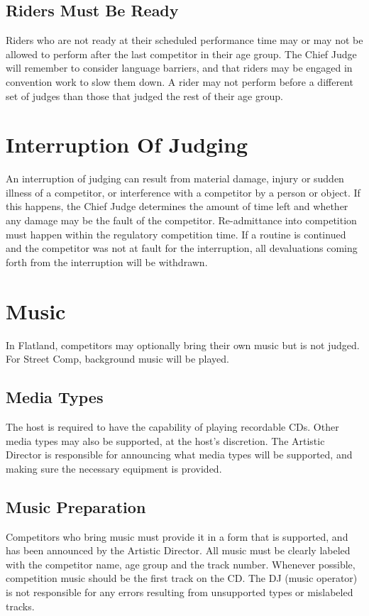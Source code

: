 \subsection{Riders Must Be Ready}
Riders who are not ready at their scheduled performance time may or may not be allowed to perform after the last competitor in their age group. The Chief Judge will remember to consider language barriers, and that riders may be engaged in convention work to slow them down. A rider may not perform before a different set of judges than those that judged the rest of their age group.

\section{Interruption Of Judging}
An interruption of judging can result from material damage, injury or sudden illness of a competitor, or interference with a competitor by a person or object. If this happens, the Chief Judge determines the amount of time left and whether any damage may be the fault of the competitor. Re-admittance into competition must happen within the regulatory competition time. If a routine is continued and the competitor was not at fault for the interruption, all devaluations coming forth from the interruption will be withdrawn.

\section{Music}
In Flatland, competitors may optionally bring their own music but is not judged. For Street Comp, background music will be played.

\subsection{Media Types}
The host is required to have the capability of playing recordable CDs. Other media types may also be supported, at the host's discretion. The Artistic Director is responsible for announcing what media types will be supported, and making sure the necessary equipment is provided.

\subsection{Music Preparation}
Competitors who bring music must provide it in a form that is supported, and has been announced by the Artistic Director. All music must be clearly labeled with the competitor name, age group and the track number. Whenever possible, competition music should be the first track on the CD. The DJ (music operator) is not responsible for any errors resulting from unsupported types or mislabeled tracks.

